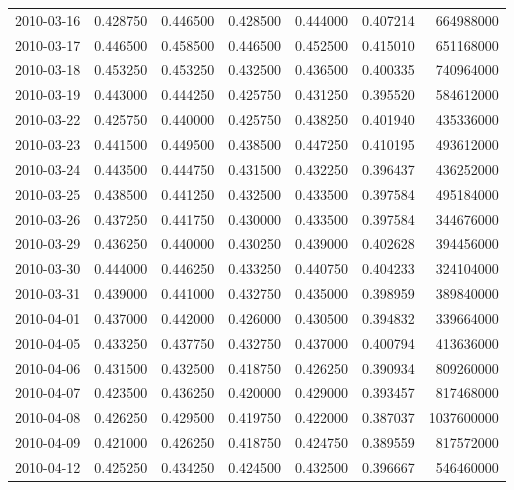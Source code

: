 \begin{tabular}{lrrrrrr}
2010-03-16 &    0.428750 &    0.446500 &    0.428500 &    0.444000 &    0.407214 &   664988000 \\
2010-03-17 &    0.446500 &    0.458500 &    0.446500 &    0.452500 &    0.415010 &   651168000 \\
2010-03-18 &    0.453250 &    0.453250 &    0.432500 &    0.436500 &    0.400335 &   740964000 \\
2010-03-19 &    0.443000 &    0.444250 &    0.425750 &    0.431250 &    0.395520 &   584612000 \\
2010-03-22 &    0.425750 &    0.440000 &    0.425750 &    0.438250 &    0.401940 &   435336000 \\
2010-03-23 &    0.441500 &    0.449500 &    0.438500 &    0.447250 &    0.410195 &   493612000 \\
2010-03-24 &    0.443500 &    0.444750 &    0.431500 &    0.432250 &    0.396437 &   436252000 \\
2010-03-25 &    0.438500 &    0.441250 &    0.432500 &    0.433500 &    0.397584 &   495184000 \\
2010-03-26 &    0.437250 &    0.441750 &    0.430000 &    0.433500 &    0.397584 &   344676000 \\
2010-03-29 &    0.436250 &    0.440000 &    0.430250 &    0.439000 &    0.402628 &   394456000 \\
2010-03-30 &    0.444000 &    0.446250 &    0.433250 &    0.440750 &    0.404233 &   324104000 \\
2010-03-31 &    0.439000 &    0.441000 &    0.432750 &    0.435000 &    0.398959 &   389840000 \\
2010-04-01 &    0.437000 &    0.442000 &    0.426000 &    0.430500 &    0.394832 &   339664000 \\
2010-04-05 &    0.433250 &    0.437750 &    0.432750 &    0.437000 &    0.400794 &   413636000 \\
2010-04-06 &    0.431500 &    0.432500 &    0.418750 &    0.426250 &    0.390934 &   809260000 \\
2010-04-07 &    0.423500 &    0.436250 &    0.420000 &    0.429000 &    0.393457 &   817468000 \\
2010-04-08 &    0.426250 &    0.429500 &    0.419750 &    0.422000 &    0.387037 &  1037600000 \\
2010-04-09 &    0.421000 &    0.426250 &    0.418750 &    0.424750 &    0.389559 &   817572000 \\
2010-04-12 &    0.425250 &    0.434250 &    0.424500 &    0.432500 &    0.396667 &   546460000 \\

\end{tabular}
